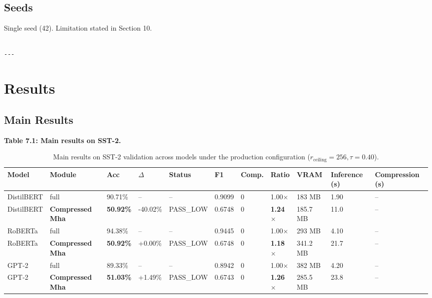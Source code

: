 \subsection{Seeds}

Single seed (42). Limitation stated in Section 10.
\begin{lstlisting}

---
\end{lstlisting}

\section{Results}

\subsection{Main Results}

\textbf{Table 7.1: Main results on SST-2.}

\begin{table}[t]
\centering
\small
\begin{tabular}{lllllllllll}
\toprule
\textbf{Model} & \textbf{Module} & \textbf{Acc} & \textbf{$\Delta$} & \textbf{Status} & \textbf{F1} & \textbf{Comp.} & \textbf{Ratio} & \textbf{VRAM} & \textbf{Inference (s)} & \textbf{Compression (s)} \\
\midrule
DistilBERT & full & 90.71\% & -- & -- & 0.9099 & 0 & 1.00$\times$ & 183 MB & 1.90 & -- \\
DistilBERT & \textbf{Compressed Mha} & \textbf{50.92\%} & -40.02\% & PASS\_LOW & 0.6748 & 0 & \textbf{1.24$\times$} & 185.7 MB & 11.0 & -- \\
RoBERTa & full & 94.38\% & -- & -- & 0.9445 & 0 & 1.00$\times$ & 293 MB & 4.10 & -- \\
RoBERTa & \textbf{Compressed Mha} & \textbf{50.92\%} & +0.00\% & PASS\_LOW & 0.6748 & 0 & \textbf{1.18$\times$} & 341.2 MB & 21.7 & -- \\
GPT-2 & full & 89.33\% & -- & -- & 0.8942 & 0 & 1.00$\times$ & 382 MB & 4.20 & -- \\
GPT-2 & \textbf{Compressed Mha} & \textbf{51.03\%} & +1.49\% & PASS\_LOW & 0.6743 & 0 & \textbf{1.26$\times$} & 285.5 MB & 23.8 & -- \\
\bottomrule
\end{tabular}
\caption{Main results on SST-2 validation across models under the production configuration ($r_{\mathrm{ceiling}}=256, \tau=0.40$).}
\label{tab:main_sst2}
\end{table}

